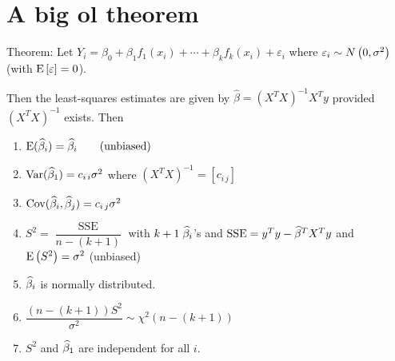\section{A big ol theorem}

\nl Theorem: Let $Y_i = \beta_0 + \beta_1 f_1(x_i) + \cdots + \beta_k f_k (x_i) + \varepsilon_i$ where $\varepsilon_i \sim \normalDist{0, \sigma^2}$ (with $\Eb{\varepsilon} = 0$).

\nl Then the least-squares estimates are given by $\widehat{\beta} = (X^TX)^{-1}X^Ty$ provided $(X^TX)^{-1}$ exists. Then 

\begin{enumerate}[label=\textcircled{\raisebox{-1pt}{\arabic*}}]
    \item $\E*{\betah_i} = \betah_i \qquad \text{(unbiased)}$
    \item $\Var*{\betah_1} = c_{i\,i} \sigma^2$ \hspace{.2in} where $(X^TX)^{-1} = [c_{i\,j}]$
    \item $\operatorname{Cov}(\widehat{\beta}_i, \widehat{\beta}_j) = c_{i\,j} \sigma^2$
    \item $S^2 = \dfrac{\operatorname{SSE}}{n-(k+1)}$ \hspace{.1in} with $k+1 \; \widehat{\beta}_i$'s and $\operatorname{SSE} = y^Ty - \widehat{\beta}^T X^Ty$ and $\E{S^2} = \sigma^2$ (unbiased)
    \item $\widehat{\beta}_i$ is normally distributed.
    \item $\dfrac{(n-(k+1))S^2}{\sigma^2} \sim \chi^2(n-(k+1))$
    \item $S^2$ and $\widehat{\beta}_1$ are independent for all $i$.
\end{enumerate}